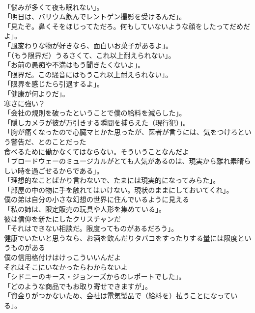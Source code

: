 \documentclass[8pt]{extreport}
\begin{document}
\begin{CJK}{UTF8}{min}
\\	「悩みが多くて夜も眠れない」。	
\\	「明日は、バリウム飲んでレントゲン撮影を受けるんだ」。	
\\	「見たぞ。鼻くそをほじってただろ。何もしていないような顔をしたってだめだよ」。	
\\	「風変わりな物が好きなら、面白いお菓子があるよ」。	
\\	「（もう限界だ）うるさくて、これ以上耐えられない」。	
\\	「お前の愚痴や不満はもう聞きたくないよ」。	
\\	「限界だ。この騒音にはもうこれ以上耐えられない」。	
\\	「限界を感じたら引退するよ」。	
\\	「健康が何よりだ」。	
\\	寒さに強い？	
\\	「会社の規則を破ったということで僕の給料を減らした」。	
\\	「隠しカメラが彼が万引きする瞬間を捕らえた（現行犯）」。	
\\	「胸が痛くなったので心臓マヒかた思ったが、医者が言うには、気をつけろという警告だ、とのことだった
\\	食べるために働かなくてはならない。そういうことなんだよ	
\\	「ブロードウェーのミュージカルがとても人気があるのは、現実から離れ素晴らしい時を過ごせるからである」。	
\\	「理想的なことばかり言わないで、たまには現実的になってみらた」。	
\\	「部屋の中の物に手を触れてはいけない。現状のままにしておいてくれ」。	
\\	僕の弟は自分の小さな幻想の世界に住んでいるように見える	
\\	「私の姉は、限定販売の玩具や人形を集めている」。	
\\	彼は信仰を新たにしたクリスチャンだ	
\\	「それはできない相談だ。限度ってものがあるだろう」。	
\\	健康でいたいと思うなら、お酒を飲んだりタバコをすったりする量には限度というものがある	
\\	僕の信用格付けはけっこういいんだよ	
\\	それはそこにいなかったらわからないよ	
\\	「シドニーのキース・ジョンーズからのレポートでした」。	
\\	「どのような商品でもお取り寄せできますが」。	
\\	「資金りがつかないため、会社は電気製品で（給料を）払うことになっている」。	

\end{CJK}
\end{document}
